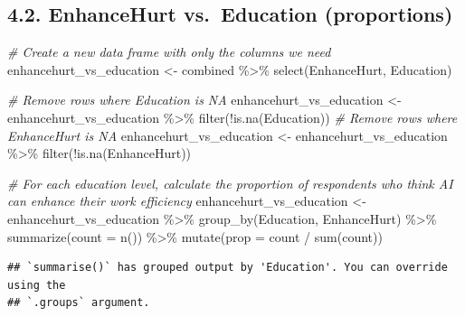 \documentclass[
]{article}
\newenvironment{Shaded}{\begin{snugshade}}{\end{snugshade}}
\newcommand{\AttributeTok}[1]{\textcolor[rgb]{0.77,0.63,0.00}{#1}}
\newcommand{\CommentTok}[1]{\textcolor[rgb]{0.56,0.35,0.01}{\textit{#1}}}
\newcommand{\FunctionTok}[1]{\textcolor[rgb]{0.00,0.00,0.00}{#1}}
\newcommand{\NormalTok}[1]{#1}
\newcommand{\OtherTok}[1]{\textcolor[rgb]{0.56,0.35,0.01}{#1}}
\newcommand{\SpecialCharTok}[1]{\textcolor[rgb]{0.00,0.00,0.00}{#1}}
\begin{document}
\hypertarget{enhancehurt-vs.-education-proportions}{%
\subsection{4.2. EnhanceHurt vs.~Education
(proportions)}\label{enhancehurt-vs.-education-proportions}}

\begin{Shaded}
\begin{Highlighting}[]
\CommentTok{\# Create a new data frame with only the columns we need}
\NormalTok{enhancehurt\_vs\_education }\OtherTok{\textless{}{-}}\NormalTok{ combined }\SpecialCharTok{\%\textgreater{}\%} \FunctionTok{select}\NormalTok{(EnhanceHurt, Education)}

\CommentTok{\# Remove rows where Education is NA}
\NormalTok{enhancehurt\_vs\_education }\OtherTok{\textless{}{-}}\NormalTok{ enhancehurt\_vs\_education }\SpecialCharTok{\%\textgreater{}\%} \FunctionTok{filter}\NormalTok{(}\SpecialCharTok{!}\FunctionTok{is.na}\NormalTok{(Education))}
\CommentTok{\# Remove rows where EnhanceHurt is NA}
\NormalTok{enhancehurt\_vs\_education }\OtherTok{\textless{}{-}}\NormalTok{ enhancehurt\_vs\_education }\SpecialCharTok{\%\textgreater{}\%} \FunctionTok{filter}\NormalTok{(}\SpecialCharTok{!}\FunctionTok{is.na}\NormalTok{(EnhanceHurt))}

\CommentTok{\# For each education level, calculate the proportion of respondents who think AI can enhance their work efficiency}
\NormalTok{enhancehurt\_vs\_education }\OtherTok{\textless{}{-}}\NormalTok{ enhancehurt\_vs\_education }\SpecialCharTok{\%\textgreater{}\%}
  \FunctionTok{group\_by}\NormalTok{(Education, EnhanceHurt) }\SpecialCharTok{\%\textgreater{}\%}
  \FunctionTok{summarize}\NormalTok{(}\AttributeTok{count =} \FunctionTok{n}\NormalTok{()) }\SpecialCharTok{\%\textgreater{}\%}
  \FunctionTok{mutate}\NormalTok{(}\AttributeTok{prop =}\NormalTok{ count }\SpecialCharTok{/} \FunctionTok{sum}\NormalTok{(count))}
\end{Highlighting}
\end{Shaded}

\begin{verbatim}
## `summarise()` has grouped output by 'Education'. You can override using the
## `.groups` argument.
\end{verbatim}
\end{document}
